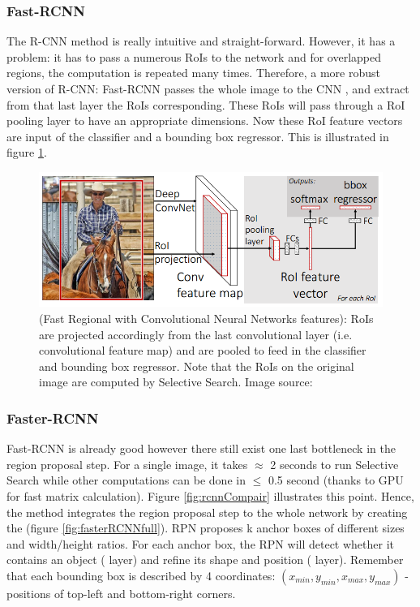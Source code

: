 \subsubsection{Fast-RCNN}
The R-CNN method is really intuitive and straight-forward. However, it has a problem: it has to pass a numerous RoIs to the network and for overlapped regions, the computation is repeated many times. Therefore, a more robust version of R-CNN: Fast-RCNN \cite{DBLP:journals/corr/Girshick15} passes the whole image to the CNN , and extract from that last layer the RoIs corresponding. These RoIs will pass through a RoI pooling layer to have an appropriate dimensions. Now these RoI feature vectors are input of the classifier and a bounding box regressor. This is illustrated in figure \ref{fig:fastRCNN}.
\begin{figure}[tb]
	\centering
	\includegraphics[width=0.9\hsize]{./figures/fastRCNN}
	\caption{ (Fast Regional with Convolutional Neural Networks features): RoIs are projected accordingly from the last convolutional layer (i.e. convolutional feature map) and are pooled to feed in the classifier and bounding box regressor. Note that the RoIs on the original image are computed by Selective Search. Image source: \cite{DBLP:journals/corr/Girshick15}}
	\label{fig:fastRCNN}
\end{figure}

\subsubsection{Faster-RCNN}
Fast-RCNN is already good however there still exist one last bottleneck in the region proposal step. For a single image, it takes $\approx$ 2 seconds to run Selective Search while other computations can be done in $\leq$ 0.5 second (thanks to GPU for fast matrix calculation). Figure \ref{fig:rcnnCompair} illustrates this point. Hence, the  method \cite{DBLP:journals/corr/RenHG015} integrates the region proposal step to the whole network by creating the   (figure \ref{fig:fasterRCNNfull}). RPN proposes k anchor boxes of different sizes and width/height ratios. For each anchor box, the RPN will detect whether it contains an object ( layer) and refine its shape and position ( layer). Remember that each bounding box is described by 4 coordinates: $(x_{min}, y_{min}, x_{max}, y_{max})$ - positions of top-left and bottom-right corners.

